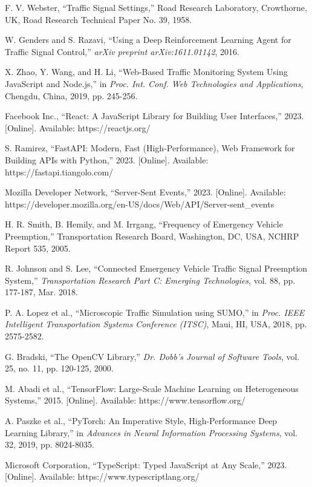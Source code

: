 \documentclass[conference]{IEEEtran}
\begin{document}
\begin{thebibliography}{20}
F. V. Webster, ``Traffic Signal Settings,'' Road Research Laboratory, Crowthorne, UK, Road Research Technical Paper No. 39, 1958.

W. Genders and S. Razavi, ``Using a Deep Reinforcement Learning Agent for Traffic Signal Control,'' \textit{arXiv preprint arXiv:1611.01142}, 2016.

X. Zhao, Y. Wang, and H. Li, ``Web-Based Traffic Monitoring System Using JavaScript and Node.js,'' in \textit{Proc. Int. Conf. Web Technologies and Applications}, Chengdu, China, 2019, pp. 245-256.

Facebook Inc., ``React: A JavaScript Library for Building User Interfaces,'' 2023. [Online]. Available: https://reactjs.org/

S. Ramirez, ``FastAPI: Modern, Fast (High-Performance), Web Framework for Building APIs with Python,'' 2023. [Online]. Available: https://fastapi.tiangolo.com/

Mozilla Developer Network, ``Server-Sent Events,'' 2023. [Online]. Available: https://developer.mozilla.org/en-US/docs/Web/API/Server-sent\_events

H. R. Smith, B. Hemily, and M. Irrgang, ``Frequency of Emergency Vehicle Preemption,'' Transportation Research Board, Washington, DC, USA, NCHRP Report 535, 2005.

R. Johnson and S. Lee, ``Connected Emergency Vehicle Traffic Signal Preemption System,'' \textit{Transportation Research Part C: Emerging Technologies}, vol. 88, pp. 177-187, Mar. 2018.

P. A. Lopez et al., ``Microscopic Traffic Simulation using SUMO,'' in \textit{Proc. IEEE Intelligent Transportation Systems Conference (ITSC)}, Maui, HI, USA, 2018, pp. 2575-2582.

G. Bradski, ``The OpenCV Library,'' \textit{Dr. Dobb's Journal of Software Tools}, vol. 25, no. 11, pp. 120-125, 2000.

M. Abadi et al., ``TensorFlow: Large-Scale Machine Learning on Heterogeneous Systems,'' 2015. [Online]. Available: https://www.tensorflow.org/

A. Paszke et al., ``PyTorch: An Imperative Style, High-Performance Deep Learning Library,'' in \textit{Advances in Neural Information Processing Systems}, vol. 32, 2019, pp. 8024-8035.

Microsoft Corporation, ``TypeScript: Typed JavaScript at Any Scale,'' 2023. [Online]. Available: https://www.typescriptlang.org/

\end{thebibliography}
\end{document}
